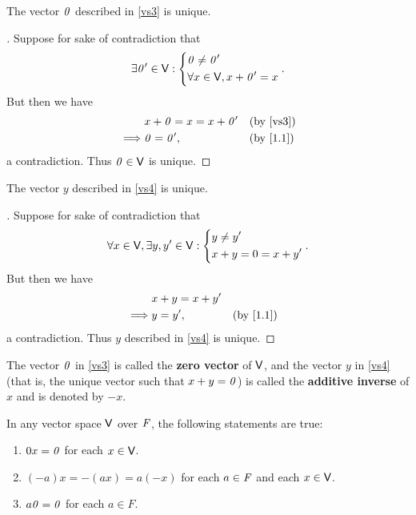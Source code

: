 \begin{cor}\label{1.2.14}
  The vector \(\mathit{0}\) described in \ref{vs3} is unique.
\end{cor}

\begin{proof}[]
  Suppose for sake of contradiction that
  \[
    \exists \mathit{0}' \in \mathsf{V} : \begin{dcases}
      \mathit{0} \neq \mathit{0}' \\
      \forall x \in \mathsf{V}, x + \mathit{0}' = x
    \end{dcases}.
  \]
  But then we have
  \begin{align*}
             & x + \zv = x = x + \zv' &  & \text{(by \ref{vs3})} \\
    \implies & \zv = \zv',            &  & \by{1.1}
  \end{align*}
  a contradiction.
  Thus \(\mathit{0} \in \mathsf{V}\) is unique.
\end{proof}

\begin{cor}\label{1.2.15}
  The vector \(y\) described in \ref{vs4} is unique.
\end{cor}

\begin{proof}[]
  Suppose for sake of contradiction that
  \[
    \forall x \in \mathsf{V}, \exists y, y' \in \mathsf{V} : \begin{dcases}
      y \neq y' \\
      x + y = 0 = x + y'
    \end{dcases}.
  \]
  But then we have
  \begin{align*}
             & x + y = x + y'               \\
    \implies & y = y',        &  & \by{1.1}
  \end{align*}
  a contradiction.
  Thus \(y\) described in \ref{vs4} is unique.
\end{proof}

\begin{defn}\label{1.2.16}
  The vector \(\mathit{0}\) in \ref{vs3} is called the \textbf{zero vector} of \(\mathsf{V}\), and the vector \(y\) in \ref{vs4} (that is, the unique vector such that \(x + y = \mathit{0}\)) is called the \textbf{additive inverse} of \(x\) and is denoted by \(-x\).
\end{defn}

\begin{thm}\label{1.2}
  In any vector space \(\mathsf{V}\) over \(\mathit{F}\), the following statements are true:
  \begin{enumerate}
    \item \(0x = \mathit{0}\) for each \(x \in \mathsf{V}\).
    \item \((-a)x = -(ax) = a(-x)\) for each \(a \in \mathit{F}\) and each \(x \in \mathsf{V}\).
    \item \(a\mathit{0} = \mathit{0}\) for each \(a \in F\).
  \end{enumerate}
\end{thm}

